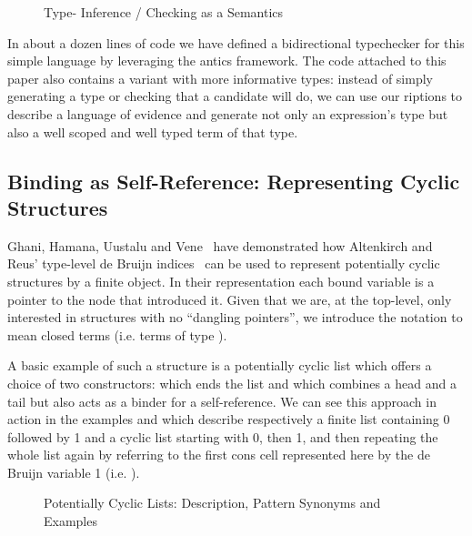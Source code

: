 \begin{figure}[h]
\caption{Type- Inference / Checking as a Semantics}
\end{figure}

In about a dozen lines of code we have defined a bidirectional typechecker for
this simple language by leveraging the antics framework. The code attached
to this paper also contains a variant with more informative types: instead of simply
generating a type or checking that a candidate will do, we can use our riptions
to describe a language of evidence and generate not only an expression's type but
also a well scoped and well typed term of that type.

\subsection{Binding as Self-Reference: Representing Cyclic Structures}\label{def:colist}

Ghani, Hamana, Uustalu and Vene~\citeyear{ghani2006representing} have
demonstrated how Altenkirch and Reus' type-level de Bruijn
indices~\citeyear{altenkirch1999monadic} can be used to represent
potentially cyclic structures by a finite object. In their
representation each bound variable is a pointer to the node
that introduced it. Given that we are, at the top-level, only
interested in structures with no ``dangling pointers'', we introduce
the notation   to mean closed terms (i.e. terms of type
   \AIC{[]}).

A basic example of such a structure is a potentially cyclic list which
offers a choice of two constructors: \AIC{[]} which ends the list and
\AIC{\_:\!:\_} which combines a head and a tail but also acts as a binder
for a self-reference. We can see this approach in action in the examples
\AF{[0, 1]} and  which describe respectively a finite list containing
0 followed by 1 and a cyclic list starting with 0, then 1, and then
repeating the whole list again by referring to the first cons cell
represented here by the de Bruijn variable 1 (i.e.  ).

\begin{figure}[h]
\begin{minipage}{0.55\textwidth}
\end{minipage}\hspace{2em}
\begin{minipage}{0.35\textwidth}
\end{minipage}
\caption{Potentially Cyclic Lists: Description, Pattern Synonyms and Examples}
\end{figure}

